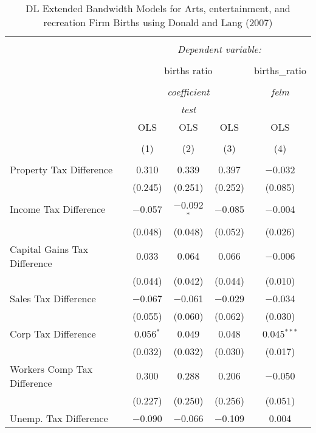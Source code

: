 
\begin{table}[!htbp] \centering 
  \caption{DL Extended Bandwidth Models for  Arts, entertainment, and recreation Firm Births using Donald and Lang (2007)} 
  \label{} 
\begin{tabular}{@{\extracolsep{5pt}}lcccc} 
\\[-1.8ex]\hline 
\hline \\[-1.8ex] 
 & \multicolumn{4}{c}{\textit{Dependent variable:}} \\ 
\cline{2-5} 
\\[-1.8ex] & \multicolumn{3}{c}{births ratio} & births\_ratio \\ 
\\[-1.8ex] & \multicolumn{3}{c}{\textit{coefficient}} & \textit{felm} \\ 
 & \multicolumn{3}{c}{\textit{test}} & \textit{} \\ 
 & OLS & OLS & OLS & OLS \\ 
\\[-1.8ex] & (1) & (2) & (3) & (4)\\ 
\hline \\[-1.8ex] 
 Property Tax Difference & 0.310 & 0.339 & 0.397 & $-$0.032 \\ 
  & (0.245) & (0.251) & (0.252) & (0.085) \\ 
  Income Tax Difference & $-$0.057 & $-$0.092$^{*}$ & $-$0.085 & $-$0.004 \\ 
  & (0.048) & (0.048) & (0.052) & (0.026) \\ 
  Capital Gains Tax Difference & 0.033 & 0.064 & 0.066 & $-$0.006 \\ 
  & (0.044) & (0.042) & (0.044) & (0.010) \\ 
  Sales Tax Difference & $-$0.067 & $-$0.061 & $-$0.029 & $-$0.034 \\ 
  & (0.055) & (0.060) & (0.062) & (0.030) \\ 
  Corp Tax Difference & 0.056$^{*}$ & 0.049 & 0.048 & 0.045$^{***}$ \\ 
  & (0.032) & (0.032) & (0.030) & (0.017) \\ 
  Workers Comp Tax Difference & 0.300 & 0.288 & 0.206 & $-$0.050 \\ 
  & (0.227) & (0.250) & (0.256) & (0.051) \\ 
  Unemp. Tax Difference & $-$0.090 & $-$0.066 & $-$0.109 & 0.004 \\ 

\end{tabular}
\end{table}
